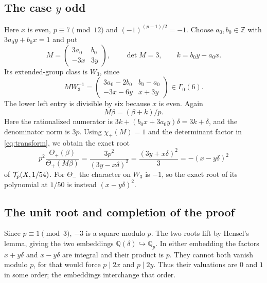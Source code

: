 \documentclass[11pt,a4paper]{article}
\theoremstyle{remark}\newtheorem{remark}[theorem]{Remark}
\newcommand{\Z}{\mathbb Z}\newcommand{\Q}{\mathbb Q}
\newcommand{\smat}[4]{\begin{pmatrix}#1&#2\\#3&#4\end{pmatrix}}
\begin{document}
\subsection{The case \texorpdfstring{$y$}{y} odd}
Here $x$ is even, $p\equiv7\pmod{12}$ and $(-1)^{(p-1)/2}=-1$.
Choose $a_0,b_0\in\Z$ with $3a_0y+b_0x=1$ and put
\begin{equation}\label{eq:CM-odd}
 M=\smat{3a_0}{b_0}{-3x}{3y},\qquad \det M=3,
 \qquad k=b_0y-a_0x.
\end{equation}
Its extended-group class is $W_3$, since
\begin{equation}\label{eq:CM-class}
 MW_3^{-1}=
 \smat{3a_0-2b_0}{b_0-a_0}{-3x-6y}{x+3y}\in\Gamma_0(6).
\end{equation}
The lower left entry is divisible by six because $x$ is even.
Again
\begin{equation}\label{eq:CM-image-odd}
 M\beta=(\beta+k)/p.
\end{equation}
Here the rationalized numerator is
$3k+(b_0x+3a_0y)\delta=3k+\delta$, and the denominator norm is $3p$.
Using $\chi_+(M)=1$ and the determinant factor in
\eqref{eq:transform}, we obtain the exact root
\begin{equation}\label{eq:root-odd}
 p^2\frac{\Theta_+(\beta)}{\Theta_+(M\beta)}
 =\frac{3p^2}{(3y-x\delta)^2}
 =\frac{(3y+x\delta)^2}{3}=-(x-y\delta)^2
\end{equation}
of $\mathcal T_p(X,1/54)$. For $\Theta_-$ the character on $W_3$ is $-1$,
so the exact root of its polynomial at $1/50$ is instead
$(x-y\delta)^2$.

\subsection{The unit root and completion of the proof}
Since $p\equiv1\pmod3$, $-3$ is a square modulo $p$.
The two roots lift by Hensel's lemma, giving the two embeddings
$\Q(\delta)\hookrightarrow\Q_p$. In either embedding the factors
$x+y\delta$ and $x-y\delta$ are integral and their product is $p$.
They cannot both vanish modulo $p$, for that would force $p\mid2x$ and
$p\mid2y$. Thus their valuations are $0$ and $1$ in some order;
the embeddings interchange that order.
\end{document}
